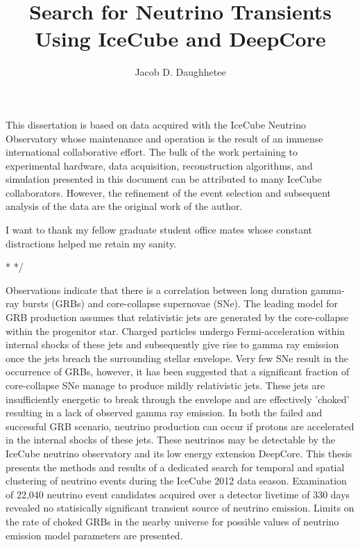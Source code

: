 \documentclass{gatech-thesis}
\title{Search for Neutrino Transients Using IceCube and DeepCore}
\author{Jacob D. Daughhetee}
\begin{document}

\begin{preliminary}
\begin{dedication}
\null\vfil
{\large
\begin{center}

\end{center}}
\vfil\null
\end{dedication}

\begin{preface}
This dissertation is based on data acquired with the IceCube Neutrino Observatory whose maintenance and operation is the result of an immense international collaborative effort. The bulk of the work pertaining to experimental hardware, data acquisition, reconstruction algorithms, and simulation presented in this document can be attributed to many IceCube collaborators. However, the refinement of the event selection and subsequent analysis of the data are the original work of the author.
\end{preface}

\begin{acknowledgements}
I want to thank my fellow graduate student office mates whose constant distractions helped me retain my sanity.
\end{acknowledgements}
\contents

\begin{summary}

\long{}
\/*
*/

Observations indicate that there is a correlation between long duration gamma-ray bursts (GRBs) and core-collapse supernovae (SNe).  The leading model for GRB production assumes that relativistic jets are generated by the core-collapse within the progenitor star.  Charged particles undergo Fermi-acceleration within internal shocks of these jets and subsequently give rise to gamma ray emission once the jets breach the surrounding stellar envelope.  Very few SNe result in the occurrence of GRBs, however, it has been suggested that a significant fraction of core-collapse SNe manage to produce mildly relativistic jets.  These jets are insufficiently energetic to break through the envelope and are effectively 'choked' resulting in a lack of observed gamma ray emission.  In both the failed and successful GRB scenario, neutrino production can occur if protons are accelerated in the internal shocks of these jets.  These neutrinos may be detectable by the IceCube neutrino observatory and its low energy extension DeepCore. This thesis presents the methods and results of a dedicated search for temporal and spatial clustering of neutrino events during the IceCube 2012 data season. Examination of 22,040 neutrino event candidates acquired over a detector livetime of 330 days revealed no statisically significant transient source of neutrino emission. Limits on the rate of choked GRBs in the nearby universe for possible values of neutrino emission model parameters are presented.


\end{summary}

\end{preliminary}
\end{document}
